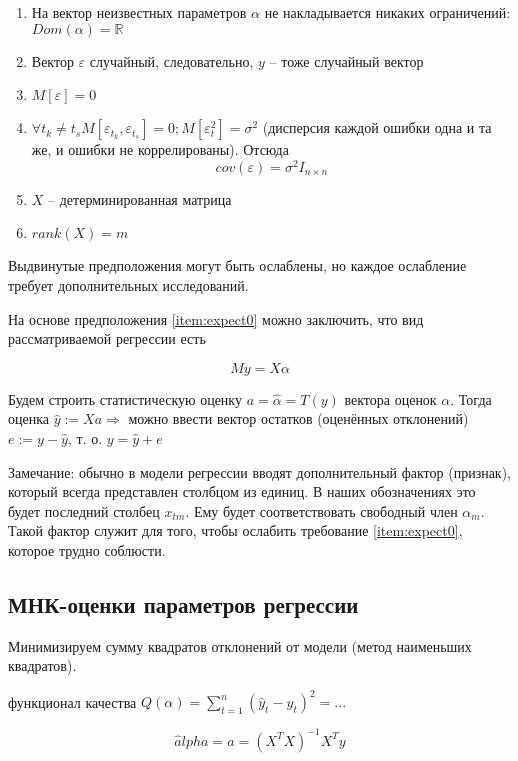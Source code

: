 \documentclass[main.tex]{subfiles}
\begin{document}
\begin{enumerate}[noitemsep]
    \item На вектор неизвестных параметров $ \alpha $ не накладывается никаких ограничений: $ Dom(\alpha) = \mathds{R} $
    \item Вектор $ \varepsilon $ случайный, следовательно, $ y $ -- тоже случайный вектор
    \item $ M [ \varepsilon ] = 0 $ \label{item:expect0}
    \item $ \forall t_k \ne t_s M[\varepsilon_{t_k}, \varepsilon_{t_s}] = 0; M[\varepsilon_t^2] = \sigma^2 $ (дисперсия каждой ошибки одна и та же, и ошибки не коррелированы). Отсюда
    $$ cov(\varepsilon) = \sigma^2 I_{n \times n} $$

    \item $ X $ -- детерминированная матрица

    \item $ rank(X) = m $ \label{item:rank}
\end{enumerate}

Выдвинутые предположения могут быть ослаблены, но каждое ослабление требует дополнительных исследований.

На основе предположения \ref{item:expect0} можно заключить, что вид рассматриваемой регрессии есть

$$ My = X \alpha $$

Будем строить статистическую оценку $ a = \hat \alpha = T(y) $ вектора оценок $ \alpha $.
Тогда оценка $ \hat y := Xa \Rightarrow $ можно ввести вектор остатков (оценённых отклонений) $ e := y - \hat y $, т. о. $ y = \hat y + e $

Замечание: обычно в модели регрессии вводят дополнительный фактор (признак), который всегда представлен столбцом из единиц.
В наших обозначениях это будет последний столбец $ x_{tm} $.
Ему будет соответствовать свободный член $ \alpha_m $.
Такой фактор служит для того, чтобы ослабить требование \ref{item:expect0}, которое трудно соблюсти.

\subsection{МНК-оценки параметров регрессии}

Минимизируем сумму квадратов отклонений от модели (метод наименьших квадратов).

функционал качества $ Q(\alpha) = \sum_{t=1}^{n} (\hat y_t - y_t)^2 = ... $

\begin{equation} \label{eq:least_sq}
    \hat alpha = a = (X^T X)^{-1} X^T y
\end{equation}
\end{document}
